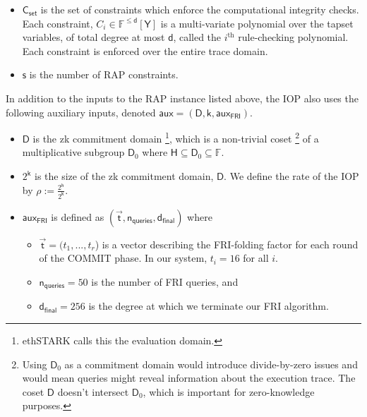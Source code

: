 \documentclass[10pt,letterpaper,titlepage]{article}
\theoremstyle{definition}
\begin{document}
\begin{itemize}
  \footnote{A tap is a reference to an entry in the trace; the constraints are expressed as a function of various taps. For more details on taps, see Appendix \ref{taps}. Note that ethSTARK uses the term \textit{mask} where we use \textit{tapset}.}. 
  \item $\mathsf{C}_\mathsf{set}$ is the set of constraints which enforce the computational integrity checks. 
  Each constraint, $C_i\in\mathbb{F}^{\leq \mathsf{d}}[\mathsf{Y}]$ is a multi-variate polynomial over the tapset variables, of total degree at most $\mathsf{d}$, called the $i^\text{th}$ rule-checking polynomial. 
  Each constraint is enforced over the entire trace domain.
  \item $\mathsf{s}$ is the number of RAP constraints.
\end{itemize} 
In addition to the inputs to the RAP instance listed above, the IOP also uses the following auxiliary inputs, denoted $\mathsf{aux}=(\mathsf{D},\mathsf{k},\mathsf{aux}_\mathsf{FRI})$.
\begin{itemize}
  \item $\mathsf{D}$ is the zk commitment domain%
  \footnote{ethSTARK calls this the evaluation domain.}, which is a non-trivial coset%
  \footnote{Using $\mathsf{D}_0$ as a commitment domain would introduce divide-by-zero issues and would mean queries might reveal information about the execution trace. 
  The coset $\mathsf{D}$ doesn't intersect $\mathsf{D}_0$, which is important for zero-knowledge purposes.}
  of a multiplicative subgroup $\mathsf{D}_0$ where $\mathsf{H}\subseteq\mathsf{D}_0\subseteq\mathbb{F}$.
  \item $2^\mathsf{k}$ is the size of the zk commitment domain, $\mathsf{D}$. 
  We define the rate of the IOP by $\rho := \frac{2^\mathsf{h}}{2^\mathsf{k}}$. 
  \item $\mathsf{aux}_\mathsf{FRI}$ is defined as $(\vec{\mathsf{t}},\mathsf{n_{queries}}, \mathsf{d_{final}})$ where 
    \begin{itemize}
      \item $\vec{\mathsf{t}}=(t_1,...,t_r$) is a vector describing the FRI-folding factor for each round of the COMMIT phase. In our system, $t_i=16$ for all $i$.
      \item $\mathsf{n_{queries}}=50$ is the number of FRI queries, and 
      \item $\mathsf{d_{final}}=256$ is the degree at which we terminate our FRI algorithm.
    \end{itemize}
\end{itemize}
\end{document}
